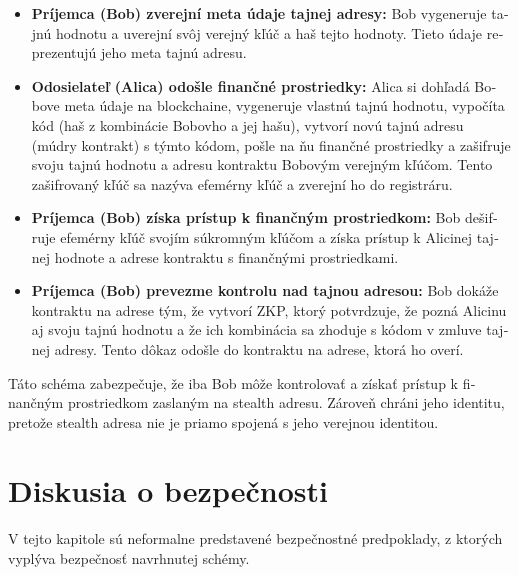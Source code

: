 \begin{otherlanguage}{slovak}
\begin{itemize}
    \item \textbf{Príjemca (Bob) zverejní meta údaje tajnej adresy:} Bob
        vygeneruje tajnú hodnotu a uverejní svôj verejný kľúč a haš tejto hodnoty.
        Tieto údaje reprezentujú jeho meta tajnú adresu.
    \item  \textbf{Odosielateľ (Alica) odošle finančné prostriedky: } Alica si dohľadá
        Bobove meta údaje na blockchaine, vygeneruje vlastnú tajnú hodnotu, vypočíta
        kód (haš z kombinácie Bobovho a jej hašu), vytvorí novú tajnú adresu (múdry kontrakt)
        s týmto kódom, pošle na ňu finančné prostriedky a zašifruje svoju tajnú hodnotu
        a adresu kontraktu Bobovým verejným kľúčom. Tento zašifrovaný kľúč sa
        nazýva efemérny kľúč a zverejní ho do registráru.
    \item \textbf{Príjemca (Bob) získa prístup k finančným prostriedkom:} Bob
        dešifruje efemérny kľúč svojím súkromným kľúčom a získa prístup k
        Alicinej tajnej hodnote a adrese kontraktu s finančnými prostriedkami.
    \item \textbf{Príjemca (Bob) prevezme kontrolu nad tajnou adresou:} Bob
        dokáže kontraktu na adrese tým, že vytvorí ZKP, ktorý potvrdzuje, že pozná
        Alicinu aj svoju tajnú hodnotu a že ich kombinácia sa zhoduje s kódom
        v zmluve tajnej adresy. Tento dôkaz odošle do kontraktu na adrese,
        ktorá ho overí.
\end{itemize}

Táto schéma zabezpečuje, že iba Bob môže kontrolovať a získať prístup k
finančným prostriedkom zaslaným na stealth adresu. Zároveň chráni jeho
identitu, pretože stealth adresa nie je priamo spojená s jeho verejnou
identitou.


\section{Diskusia o bezpečnosti}

V tejto kapitole sú neformalne predstavené bezpečnostné predpoklady, z ktorých
vyplýva bezpečnosť navrhnutej schémy.


\end{otherlanguage}
